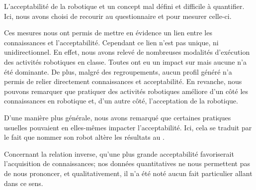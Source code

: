 
L'acceptabilité de la robotique et un concept mal défini et difficile à quantifier.
Ici, nous avons choisi de recourir au questionnaire  et  pour mesurer celle-ci.\par\vspace{0.2cm}%
Ces mesures nous ont permis de mettre en évidence un lien entre les connaissances et l'acceptabilité.
Cependant ce lien n'est pas unique, ni unidirectionnel. En effet, nous avons relevé de nombreuses modalités d'exécution des activités robotiques en classe. Toutes ont eu un impact sur  mais aucune n'a été dominante. De plus, malgré des regroupements, aucun profil généré n'a permis de relier directement connaissances et acceptabilité. En revanche, nous pouvons remarquer que pratiquer des activités robotiques améliore d'un côté les connaissances en robotique et, d'un autre côté, l'acceptation de la robotique.\par\vspace{0.2cm}%
D'une manière plus générale, nous avons remarqué que certaines pratiques usuelles pouvaient en elles-mêmes impacter l'acceptabilité. Ici, cela se traduit par le fait que nommer son robot altère les résultats au .\par\vspace{0.2cm}%
Concernant la relation inverse, \cad qu'une plus grande acceptabilité favoriserait l'acquisition de connaissances; nos données quantitatives ne nous permettent pas de nous prononcer, et qualitativement, il n'a été noté aucun fait particulier allant dans ce sens.